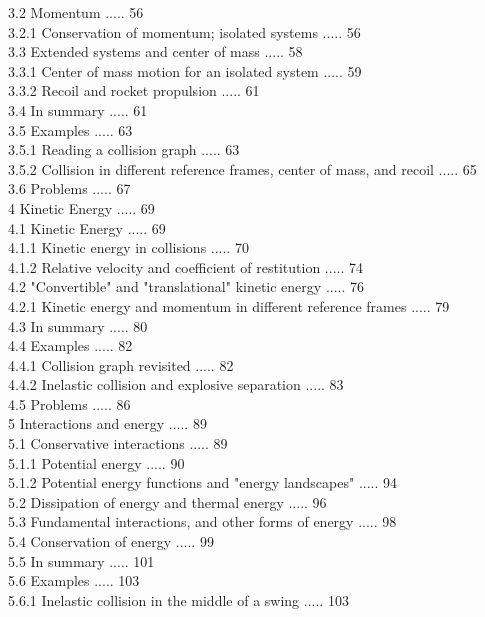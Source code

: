 \documentclass[10pt]{article}
\begin{document}
3.2 Momentum ..... 56\\
3.2.1 Conservation of momentum; isolated systems ..... 56\\
3.3 Extended systems and center of mass ..... 58\\
3.3.1 Center of mass motion for an isolated system ..... 59\\
3.3.2 Recoil and rocket propulsion ..... 61\\
3.4 In summary ..... 61\\
3.5 Examples ..... 63\\
3.5.1 Reading a collision graph ..... 63\\
3.5.2 Collision in different reference frames, center of mass, and recoil ..... 65\\
3.6 Problems ..... 67\\
4 Kinetic Energy ..... 69\\
4.1 Kinetic Energy ..... 69\\
4.1.1 Kinetic energy in collisions ..... 70\\
4.1.2 Relative velocity and coefficient of restitution ..... 74\\
4.2 "Convertible" and "translational" kinetic energy ..... 76\\
4.2.1 Kinetic energy and momentum in different reference frames ..... 79\\
4.3 In summary ..... 80\\
4.4 Examples ..... 82\\
4.4.1 Collision graph revisited ..... 82\\
4.4.2 Inelastic collision and explosive separation ..... 83\\
4.5 Problems ..... 86\\
5 Interactions and energy ..... 89\\
5.1 Conservative interactions ..... 89\\
5.1.1 Potential energy ..... 90\\
5.1.2 Potential energy functions and "energy landscapes" ..... 94\\
5.2 Dissipation of energy and thermal energy ..... 96\\
5.3 Fundamental interactions, and other forms of energy ..... 98\\
5.4 Conservation of energy ..... 99\\
5.5 In summary ..... 101\\
5.6 Examples ..... 103\\
5.6.1 Inelastic collision in the middle of a swing ..... 103\\
\end{document}

